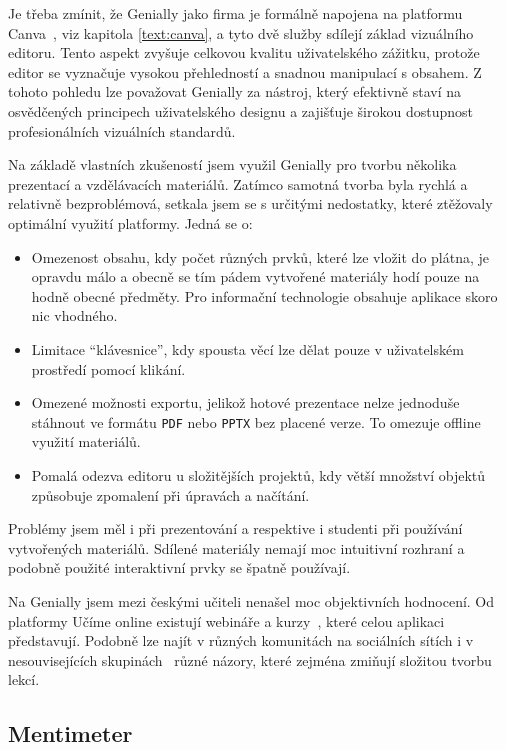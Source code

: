 Je třeba zmínit, že Genially jako firma je formálně napojena na platformu Canva~\cite{genially}, viz kapitola \ref{text:canva}, a tyto dvě služby sdílejí základ vizuálního editoru. 
Tento aspekt zvyšuje celkovou kvalitu uživatelského zážitku, protože editor se vyznačuje vysokou přehledností a snadnou manipulací s obsahem. 
Z tohoto pohledu lze považovat Genially za nástroj, který efektivně staví na osvědčených principech uživatelského designu a zajišťuje širokou dostupnost profesionálních vizuálních standardů.

Na základě vlastních zkušeností jsem využil Genially pro tvorbu několika prezentací a vzdělávacích materiálů. 
Zatímco samotná tvorba byla rychlá a relativně bezproblémová, setkala jsem se s určitými nedostatky, které ztěžovaly optimální využití platformy. 
Jedná se o:

\begin{itemize}
    \item Omezenost obsahu, kdy počet různých prvků, které lze vložit do plátna, je opravdu málo a obecně se tím pádem vytvořené materiály hodí pouze na hodně obecné předměty. Pro informační technologie obsahuje aplikace skoro nic vhodného.  
    \item Limitace \enquote{klávesnice}, kdy spousta věcí lze dělat pouze v uživatelském prostředí pomocí klikání. 
    \item Omezené možnosti exportu, jelikož hotové prezentace nelze jednoduše stáhnout ve formátu \texttt{PDF} nebo \texttt{PPTX} bez placené verze. To omezuje offline využití materiálů.  
    \item Pomalá odezva editoru u složitějších projektů, kdy větší množství objektů způsobuje zpomalení při úpravách a načítání.  
\end{itemize}

Problémy jsem měl i při prezentování a respektive i studenti při používání vytvořených materiálů.
Sdílené materiály nemají moc intuitivní rozhraní a podobně použité interaktivní prvky se špatně používají.

Na Genially jsem mezi českými učiteli nenašel moc objektivních hodnocení.
Od platformy Učíme online existují webináře a kurzy~\cite{genially_ucimeonline}, které celou aplikaci představují.
Podobně lze najít v různých komunitách na sociálních sítích i v nesouvisejících skupinách~\cite{canva_facebook} různé názory, které zejména zmiňují složitou tvorbu lekcí.

\subsection{Mentimeter}

